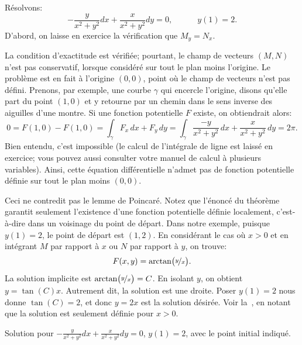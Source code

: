 \begin{example}
	Résolvons:
	\begin{equation*}
		-\frac{y}{x^2+y^2} dx + \frac{x}{x^2+y^2} dy = 0, \quad  \qquad y(1) = 2.
	\end{equation*}
	D'abord, on laisse en exercice la vérification que 	$M_y = N_x$.

	La condition d'exactitude est vérifiée; pourtant, le champ de vecteurs $(M,N)$ n'est pas conservatif,
	lorsque considéré sur tout le plan moins l'origine.
	Le problème est en fait à l'origine $(0,0)$, point où le champ de vecteurs n'est pas défini.
	Prenons, par exemple, une courbe $\gamma$ qui encercle l'origine, disons qu'elle part du point $(1,0)$
	et y retourne par un chemin dans le sens inverse des aiguilles d'une montre. 
	Si une fonction potentielle $F$ existe, on obtiendrait alors:
	\begin{equation*}
		0 = F(1,0) - F(1,0) = \int_\gamma F_x \, dx + F_y \, dy
							= \int_\gamma \frac{-y}{x^2+y^2} \, dx + \frac{x}{x^2+y^2} \, dy = 2\pi .
	\end{equation*}
	Bien entendu, c'est impossible (le calcul de l'intégrale de ligne est laissé  en exercice; vous pouvez aussi consulter votre manuel de calcul à plusieurs variables). 
	Ainsi, cette équation différentielle n'admet pas de fonction potentielle définie sur tout le plan moins $(0,0)$.

	Ceci ne contredit pas le lemme de Poincaré.
	Notez que l'énoncé du théorème garantit seulement l'existence d'une fonction potentielle définie localement,
	c'est-à-dire dans un voisinage du point de départ.   Dans notre exemple, puisque $y(1) = 2$, le point de départ est $(1,2)$.
	En considérant le cas où $x > 0$ et en intégrant $M$ par rapport à $x$ ou $N$ par rapport à $y$, on trouve:
	\begin{equation*}
		F(x,y) = \operatorname{arctan} \bigl( \nicefrac{y}{x} \bigr) .
	\end{equation*}
	La solution implicite est
	$\operatorname{arctan} \bigl( \nicefrac{y}{x} \bigr) = C$. 
	En isolant $y$, on obtient
	$y = \tan(C) x$.  Autrement dit, la solution est une droite.  
	Poser $y(1) = 2$ nous donne $\tan(C) = 2$, et donc $y= 2x$ est la solution désirée.
	Voir la~, en notant que la solution est seulement définie pour $x >
	0$.
	\begin{myfig}
		\capstart	{}
		\caption{Solution pour
		$-\frac{y}{x^2+y^2} dx + \frac{x}{x^2+y^2} dy = 0$, $y(1) = 2$,
		avec le point initial indiqué.\label{exact:y2x}}
	\end{myfig}
\end{example}

